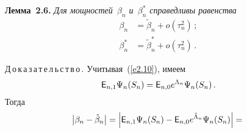 \begin{multicols}{2}
\noindent
\textbf{Лемма~2.6.} {\it Для мощностей~$\beta_n$ и~$\beta_n^*$ справедливы равенства
\begin{align*}
\beta_n &=\tilde\beta_n+ o \left(\tau_n^2\right)\,;
\\
\beta_n^* &=\tilde\beta_n^*+ o\left(\tau_n^2\right)\,.  %
\end{align*}}

\smallskip

\noindent
Д\,о\,к\,а\,з\,а\,т\,е\,л\,ь\,с\,т\,в\,о\,.
Учитывая~(\ref{e2.10}), имеем
$$
{{\sf E}}_{n,1}\Psi_n(S_n)={{\sf E}}_{n,0}e^{\Lambda_n}\Psi_n(S_n)\,.
$$
Тогда
\begin{equation*}
\left|\beta_n-\tilde\beta_n\right|=\left|{{\sf E}}_{n,1}\Psi_n(S_n)-{{\sf E}}_{n,0}e^{\tilde\Lambda_n}\Psi_n(S_n)\right|={}
\end{equation*}


\end{multicols}
